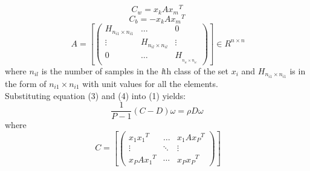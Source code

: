 \documentclass[10pt,journal,compsoc]{IEEEtran}
\begin{document}
\begin{equation}
{{C_w} = {x_k}A{x_m}^T} \end{equation}
\begin{equation} {C_b} =  - {x_k}A{x_m}^T \end{equation}
\begin{equation} \ A = \left[ {\left( {\begin{array}{*{20}{c}}{{H_{{n_{i1}} \times {n_{i1}}}}}& \ldots &0\\
 \vdots &{{H_{{n_{il}} \times {n_{il}}}}}& \vdots \\
0& \ldots &{{H_{_{{n_{ic}} \times {n_{ic}}}}}}
\end{array}} \right)} \right] \in {R^{n \times n}} \end{equation}
where ${n_{il}}$ is the number of samples in the \textit{l}th class of the set $x_i$ and ${H_{{n_{i{1}}} \times {n_{i1}}}}$ is in the form of ${n_{i1}} \times {n_{i1}}$ with unit values for all the elements. \\ Substituting equation (3) and (4) into (1) yields:
\begin{equation} \frac{{1}}{{P - 1}}(C - D)\omega  = \rho D\omega \end{equation}
where
\begin{equation} \ C = \left[ {\left( {\begin{array}{*{20}{c}}
{{x_1}{x_1}^T}& \ldots &{{x_1}A{x_P}^T}\\
 \vdots & \ddots & \vdots \\
{{x_P}A{x_1}^T}& \cdots &{{x_P}{x_P}^T}
\end{array}} \right)} \right] \end{equation}
\end{document}
